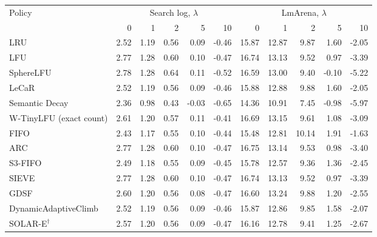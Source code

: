 \begin{tabular}{lrrrrr|rrrrr}
\toprule
Policy & \multicolumn{5}{c|}{Search log, $\lambda$} & \multicolumn{5}{c}{LmArena, $\lambda$}\\
 & 0 & 1 & 2 & 5 & 10 & 0 & 1 & 2 & 5 & 10\\
\midrule
LRU & 2.52 & 1.19 & 0.56 & 0.09 & -0.46 & 15.87 & 12.87 & 9.87 & 1.60 & -2.05\\
LFU & 2.77 & 1.28 & 0.60 & 0.10 & -0.47 & 16.74 & 13.13 & 9.52 & 0.97 & -3.39\\
SphereLFU & 2.78 & 1.28 & 0.64 & 0.11 & -0.52 & 16.59 & 13.00 & 9.40 & -0.10 & -5.22\\
LeCaR & 2.52 & 1.19 & 0.56 & 0.09 & -0.46 & 15.88 & 12.88 & 9.88 & 1.60 & -2.05\\
Semantic Decay & 2.36 & 0.98 & 0.43 & -0.03 & -0.65 & 14.36 & 10.91 & 7.45 & -0.98 & -5.97\\
W-TinyLFU (exact count) & 2.61 & 1.20 & 0.57 & 0.11 & -0.41 & 16.69 & 13.15 & 9.61 & 1.08 & -3.09\\
FIFO & 2.43 & 1.17 & 0.55 & 0.10 & -0.44 & 15.48 & 12.81 & 10.14 & 1.91 & -1.63\\
ARC & 2.77 & 1.28 & 0.60 & 0.10 & -0.47 & 16.75 & 13.14 & 9.53 & 0.98 & -3.40\\
S3-FIFO & 2.49 & 1.18 & 0.55 & 0.09 & -0.45 & 15.78 & 12.57 & 9.36 & 1.36 & -2.45\\
SIEVE & 2.77 & 1.28 & 0.60 & 0.10 & -0.47 & 16.74 & 13.13 & 9.52 & 0.97 & -3.39\\
GDSF & 2.60 & 1.20 & 0.56 & 0.08 & -0.47 & 16.60 & 13.24 & 9.88 & 1.20 & -2.55\\
DynamicAdaptiveClimb & 2.52 & 1.19 & 0.56 & 0.09 & -0.46 & 15.87 & 12.86 & 9.85 & 1.58 & -2.07\\
SOLAR-E$^{\dagger}$ & 2.57 & 1.20 & 0.56 & 0.09 & -0.47 & 16.16 & 12.78 & 9.41 & 1.25 & -2.67\\

\end{tabular}

